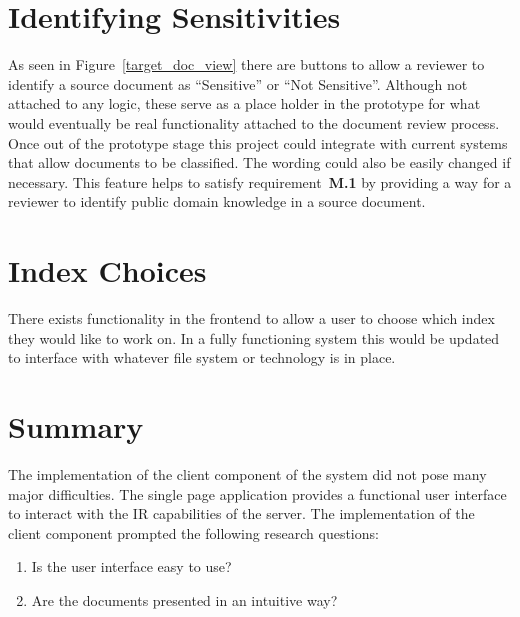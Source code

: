 \documentclass{l4proj}
\begin{document}
\section{Identifying Sensitivities}
As seen in Figure~\ref{target_doc_view} there are buttons to allow a reviewer to identify a source document as ``Sensitive'' or ``Not Sensitive''. Although not attached to any logic, these serve as a place holder in the prototype for what would eventually be real functionality attached to the document review process. Once out of the prototype stage this project could integrate with current systems that allow documents to be classified. The wording could also be easily changed if necessary. This feature helps to satisfy requirement~\textbf{M.1} by providing a way for a reviewer to identify public domain knowledge in a source document.
\section{Index Choices}
There exists functionality in the frontend to allow a user to choose which index they would like to work on. In a fully functioning system this would be updated to interface with whatever file system or technology is in place.
\section{Summary} \label{clientsummary}
The implementation of the client component of the system did not pose many major difficulties. The single page application provides a functional user interface to interact with the IR capabilities of the server.
The implementation of the client component prompted the following research questions:
\begin{center}
\begin{enumerate}[label=\textbf{Client.\arabic*}]
\item Is the user interface easy to use?
\item Are the documents presented in an intuitive way?
\end{enumerate}
\end{center}

\end{document}
